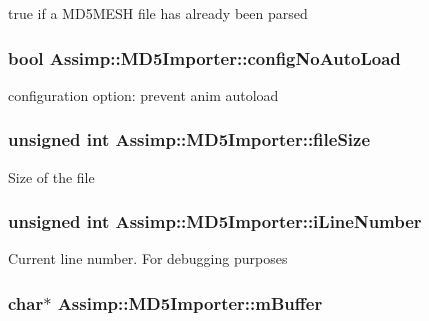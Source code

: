 true if a M\+D5\+M\+E\+S\+H file has already been parsed \hypertarget{class_assimp_1_1_m_d5_importer_a6f654966c66b6542291ef4ad26be1592}{
\subsubsection[{config\+No\+Auto\+Load}]{\setlength{\rightskip}{0pt plus 5cm}bool Assimp\+::\+M\+D5\+Importer\+::config\+No\+Auto\+Load\hspace{0.3cm}{\ttfamily [protected]}}}\label{class_assimp_1_1_m_d5_importer_a6f654966c66b6542291ef4ad26be1592}
configuration option\+: prevent anim autoload \hypertarget{class_assimp_1_1_m_d5_importer_aea09531401b7e32735dfb6ed0af09301}{
\subsubsection[{file\+Size}]{\setlength{\rightskip}{0pt plus 5cm}unsigned int Assimp\+::\+M\+D5\+Importer\+::file\+Size\hspace{0.3cm}{\ttfamily [protected]}}}\label{class_assimp_1_1_m_d5_importer_aea09531401b7e32735dfb6ed0af09301}
Size of the file \hypertarget{class_assimp_1_1_m_d5_importer_a40a2bad49954cec75bb4126c2de08f19}{
\subsubsection[{i\+Line\+Number}]{\setlength{\rightskip}{0pt plus 5cm}unsigned int Assimp\+::\+M\+D5\+Importer\+::i\+Line\+Number\hspace{0.3cm}{\ttfamily [protected]}}}\label{class_assimp_1_1_m_d5_importer_a40a2bad49954cec75bb4126c2de08f19}
Current line number. For debugging purposes \hypertarget{class_assimp_1_1_m_d5_importer_aaeef47328bed97291af1d494edd941ce}{
\subsubsection[{m\+Buffer}]{\setlength{\rightskip}{0pt plus 5cm}char$\ast$ Assimp\+::\+M\+D5\+Importer\+::m\+Buffer\hspace{0.3cm}{\ttfamily [protected]}}}\label{class_assimp_1_1_m_d5_importer_aaeef47328bed97291af1d494edd941ce}
